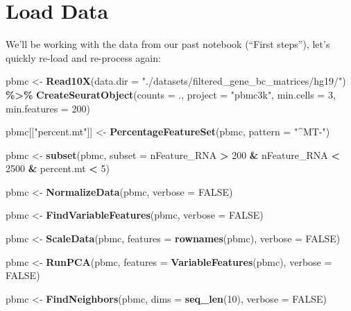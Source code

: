 \documentclass[
]{article}
\newenvironment{Shaded}{\begin{snugshade}}{\end{snugshade}}
\newcommand{\AttributeTok}[1]{\textcolor[rgb]{0.13,0.29,0.53}{#1}}
\newcommand{\ConstantTok}[1]{\textcolor[rgb]{0.56,0.35,0.01}{#1}}
\newcommand{\DecValTok}[1]{\textcolor[rgb]{0.00,0.00,0.81}{#1}}
\newcommand{\FunctionTok}[1]{\textcolor[rgb]{0.13,0.29,0.53}{\textbf{#1}}}
\newcommand{\NormalTok}[1]{#1}
\newcommand{\OtherTok}[1]{\textcolor[rgb]{0.56,0.35,0.01}{#1}}
\newcommand{\SpecialCharTok}[1]{\textcolor[rgb]{0.81,0.36,0.00}{\textbf{#1}}}
\newcommand{\StringTok}[1]{\textcolor[rgb]{0.31,0.60,0.02}{#1}}
\begin{document}
\hypertarget{load-data}{%
\section{Load Data}\label{load-data}}

We'll be working with the data from our past notebook (``First steps''),
let's quickly re-load and re-process again:

\begin{Shaded}
\begin{Highlighting}[]
\NormalTok{pbmc }\OtherTok{\textless{}{-}} \FunctionTok{Read10X}\NormalTok{(}\AttributeTok{data.dir =} \StringTok{"./datasets/filtered\_gene\_bc\_matrices/hg19/"}\NormalTok{) }\SpecialCharTok{\%\textgreater{}\%}
  \FunctionTok{CreateSeuratObject}\NormalTok{(}\AttributeTok{counts =}\NormalTok{ ., }\AttributeTok{project =} \StringTok{"pbmc3k"}\NormalTok{, }\AttributeTok{min.cells =} \DecValTok{3}\NormalTok{, }\AttributeTok{min.features =} \DecValTok{200}\NormalTok{)}

\NormalTok{pbmc[[}\StringTok{"percent.mt"}\NormalTok{]] }\OtherTok{\textless{}{-}} \FunctionTok{PercentageFeatureSet}\NormalTok{(pbmc, }\AttributeTok{pattern =} \StringTok{"\^{}MT{-}"}\NormalTok{)}

\NormalTok{pbmc }\OtherTok{\textless{}{-}} \FunctionTok{subset}\NormalTok{(pbmc, }\AttributeTok{subset =}\NormalTok{ nFeature\_RNA }\SpecialCharTok{\textgreater{}} \DecValTok{200} \SpecialCharTok{\&}\NormalTok{ nFeature\_RNA }\SpecialCharTok{\textless{}} \DecValTok{2500} \SpecialCharTok{\&}\NormalTok{ percent.mt }\SpecialCharTok{\textless{}} \DecValTok{5}\NormalTok{)}

\NormalTok{pbmc }\OtherTok{\textless{}{-}} \FunctionTok{NormalizeData}\NormalTok{(pbmc, }\AttributeTok{verbose =} \ConstantTok{FALSE}\NormalTok{)}

\NormalTok{pbmc }\OtherTok{\textless{}{-}} \FunctionTok{FindVariableFeatures}\NormalTok{(pbmc, }\AttributeTok{verbose =} \ConstantTok{FALSE}\NormalTok{)}

\NormalTok{pbmc }\OtherTok{\textless{}{-}} \FunctionTok{ScaleData}\NormalTok{(pbmc, }\AttributeTok{features =} \FunctionTok{rownames}\NormalTok{(pbmc), }\AttributeTok{verbose =} \ConstantTok{FALSE}\NormalTok{)}

\NormalTok{pbmc }\OtherTok{\textless{}{-}} \FunctionTok{RunPCA}\NormalTok{(pbmc, }\AttributeTok{features =} \FunctionTok{VariableFeatures}\NormalTok{(pbmc), }\AttributeTok{verbose =} \ConstantTok{FALSE}\NormalTok{)}

\NormalTok{pbmc }\OtherTok{\textless{}{-}} \FunctionTok{FindNeighbors}\NormalTok{(pbmc, }\AttributeTok{dims =} \FunctionTok{seq\_len}\NormalTok{(}\DecValTok{10}\NormalTok{), }\AttributeTok{verbose =} \ConstantTok{FALSE}\NormalTok{)}


\end{Highlighting}
\end{Shaded}
\end{document}
